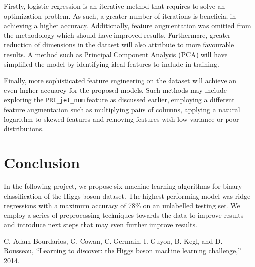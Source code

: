 \documentclass[10pt,conference,compsocconf]{IEEEtran}
\begin{document}
Firstly, logistic regression is an iterative method that requires to solve an optimization problem. As such, a greater number of iterations is beneficial in achieving a higher accuracy. Additionally, feature augmentation was omitted from the methodology which should have improved results. Furthermore, greater reduction of dimensions in the dataset will also attribute to more favourable results. A method such as Principal Component Analysis (PCA) will have simplified the model by identifying ideal features to include in training.

Finally, more sophisticated feature engineering on the dataset will achieve an even higher accuarcy for the proposed models. Such methods may include exploring the \texttt{PRI\_jet\_num} feature as discussed earlier, employing a different feature augmentation such as multiplying pairs of columns, applying a natural logarithm to skewed features and removing features with low variance or poor distributions.

\section{Conclusion}
\label{sec:conclusion}
In the following project, we propose six machine learning algorithms for binary classification of the Higgs boson dataset. The highest performing model was ridge regressions with a maximum accuracy of 78\% on an unlabelled testing set. We employ a series of preprocessing techniques towards the data to improve results and introduce next steps that may even further improve results. 

\begin{thebibliography}{1}
  C. Adam-Bourdarios, G. Cowan, C. Germain, I. Guyon, B. Kegl, and D. Rousseau, “Learning to discover: the Higgs boson machine learning challenge,” 2014.
\end{thebibliography}
\end{document}
